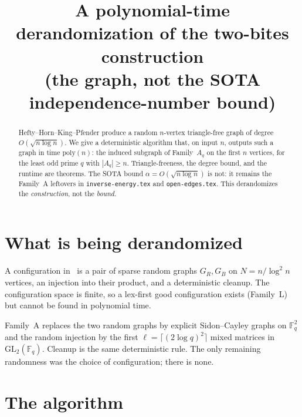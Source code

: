 \documentclass[11pt]{article}
\title{A polynomial-time derandomization of the two-bites construction\\
\large (the graph, not the SOTA independence-number bound)}
\date{}
\theoremstyle{definition}
\newcommand{\F}{\mathbb{F}}
\begin{document}
\maketitle

\begin{abstract}
Hefty--Horn--King--Pfender produce a random $n$-vertex triangle-free graph of
degree $O(\sqrt{n\log n})$.
We give a deterministic algorithm that, on input $n$, outputs such a graph in
time $\mathrm{poly}(n)$: the induced subgraph of Family~$A_q$ on the first $n$
vertices, for the least odd prime $q$ with $|A_q|\ge n$.
Triangle-freeness, the degree bound, and the runtime are theorems.
The SOTA bound $\alpha=O(\sqrt{n\log n})$ is not: it remains the Family~A
leftovers in \texttt{inverse-energy.tex} and \texttt{open-edges.tex}.
This derandomizes the \emph{construction}, not the \emph{bound}.
\end{abstract}

\section{What is being derandomized}

A configuration in~\cite{HHKP2025} is a pair of sparse random graphs $G_R,G_B$
on $N=n/\log^{2}n$ vertices, an injection into their product, and a
deterministic cleanup.
The configuration space is finite, so a lex-first good configuration exists
(Family~L) but cannot be found in polynomial time.

Family~A replaces the two random graphs by explicit Sidon--Cayley graphs on
$\F_q^{2}$ and the random injection by the first $\ell=\lceil(2\log q)^{2}\rceil$
mixed matrices in $\mathrm{GL}_2(\F_q)$.
Cleanup is the same deterministic rule.
The only remaining randomness was the choice of configuration; there is none.

\section{The algorithm}
\end{document}
